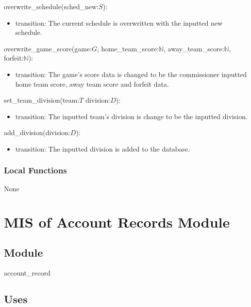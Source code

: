 \documentclass[12pt, titlepage]{article}
\begin{document}
\noindent overwrite\_schedule(sched\_new:$S$):
\begin{itemize}
\item transition: The current schedule is overwritten with the inputted new
      schedule.
\end{itemize}

\noindent overwrite\_game\_score(game:$G$, home\_team\_score:$\mathbb{N}$,
away\_team\_score:$\mathbb{N}$, forfeit:$\mathbb{N}$):
\begin{itemize}
\item transition: The game's score data is changed to be the commissioner
      inputted home team score, away team score and forfeit data.
\end{itemize}

\noindent set\_team\_division(team:$T$ division:$D$):
\begin{itemize}
\item transition: The inputted team's division is change to be the inputted
      division.
\end{itemize}

\noindent add\_division(division:$D$):
\begin{itemize}
\item transition: The inputted division is added to the database.
\end{itemize}

\subsubsection{Local Functions}


None

\newpage

\section{MIS of Account Records Module} \label{mAS}

\subsection{Module}

account\_record

\subsection{Uses}
\end{document}

